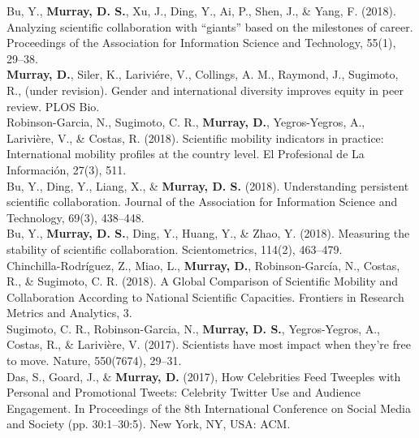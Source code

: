 \documentclass[10pt, a4paper]{article}
\newcommand{\years}[1]{\marginnote{\scriptsize #1}}
\begin{document}
\years{2019} \hangindent=0.7cm Bu, Y., \textbf{Murray, D. S.}, Xu, J., Ding, Y., Ai, P., Shen, J., \& Yang, F. (2018). Analyzing scientific collaboration with “giants” based on the milestones of career. Proceedings of the Association for Information Science and Technology, 55(1), 29–38. \\

\years{2018} \hangindent=0.7cm \textbf{Murray, D.}, Siler, K., Lariviére, V., Collings, A. M., Raymond, J., Sugimoto, R., (under revision). Gender and international diversity improves equity in peer review. PLOS Bio. \\

\years{2018} \hangindent=0.7cm Robinson-Garcia, N., Sugimoto, C. R., \textbf{Murray, D.}, Yegros-Yegros, A., Larivière, V., \& Costas, R. (2018). Scientific mobility indicators in practice: International mobility profiles at the country level. El Profesional de La Información, 27(3), 511. \\

\years{2018} \hangindent=0.7cm Bu, Y., Ding, Y., Liang, X., \& \textbf{Murray, D. S. }(2018). Understanding persistent scientific collaboration. Journal of the Association for Information Science and Technology, 69(3), 438–448. \\

\years{2018} \hangindent=0.7cm Bu, Y., \textbf{Murray, D. S.}, Ding, Y., Huang, Y., \& Zhao, Y. (2018). Measuring the stability of scientific collaboration. Scientometrics, 114(2), 463–479. \\

\years{2018} \hangindent=0.7cm Chinchilla-Rodríguez, Z., Miao, L., \textbf{Murray, D.}, Robinson-García, N., Costas, R., \& Sugimoto, C. R. (2018). A Global Comparison of Scientific Mobility and Collaboration According to National Scientific Capacities. Frontiers in Research Metrics and Analytics, 3. \\

\years{2017} \hangindent=0.7cm Sugimoto, C. R., Robinson-Garcia, N., \textbf{Murray, D. S.}, Yegros-Yegros, A., Costas, R., \& Larivière, V. (2017). Scientists have most impact when they’re free to move. Nature, 550(7674), 29–31. \\

\years{2017} \hangindent=0.7cm Das, S., Goard, J., \& \textbf{Murray, D.} (2017), How Celebrities Feed Tweeples with Personal and Promotional Tweets: Celebrity Twitter Use and Audience Engagement. In Proceedings of the 8th International Conference on Social Media and Society (pp. 30:1–30:5). New York, NY, USA: ACM. 
\end{document}

